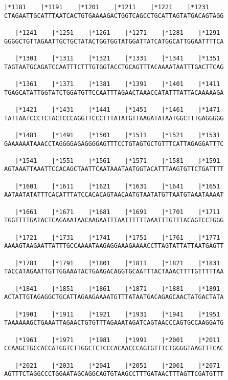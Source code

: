 \documentclass{article}
\begin{document}
\begin{Verbatim}[fontfamily=courier]
   |*1181    |*1191    |*1201    |*1211    |*1221    |*1231 
CTAGAATTGCATTTAATCACTGTGAAAAGACTGGTCAGCCTGCATTAGTATGACAGTAGG

   |*1241    |*1251    |*1261    |*1271    |*1281    |*1291 
GGGGCTGTTAGAATTGCTGCTATACTGGTGGTATGGATTATCATGGCATTGGAATTTTCA

   |*1301    |*1311    |*1321    |*1331    |*1341    |*1351 
TAGTAATGCAGATCCAATTTCTTTGTGGTACCTGCAGTTTACAAAATAATTTGACTTCAG

   |*1361    |*1371    |*1381    |*1391    |*1401    |*1411 
TGAGCATATTGGTATCTGGATGTTCCAATTTAGAACTAAACCATATTTATTACAAAAAGA

   |*1421    |*1431    |*1441    |*1451    |*1461    |*1471 
TATTAATCCCTCTACTCCCAGGTTCCCTTTATATGTTAAGATATAATGGCTTTGAGGGGG

   |*1481    |*1491    |*1501    |*1511    |*1521    |*1531 
GAAAAAATAAACCTAGGGGAGAGGGGAGTTTCCTGTAGTGCTGTTTCATTAGAGGATTTC

   |*1541    |*1551    |*1561    |*1571    |*1581    |*1591 
AGTAAATTAAATTCCACAGCTAATTCAATAAATAATGGTACATTTAAGTGTTCTGATTTT

   |*1601    |*1611    |*1621    |*1631    |*1641    |*1651 
AATAATATATTTCACATTTATCCACACAGTAACAATGTAATATGTTAATGTAAATAAAAT

   |*1661    |*1671    |*1681    |*1691    |*1701    |*1711 
TGGTTTTGATACTCAGAAATAACAAGAATTTAATTTTTTAAATTTGTTTACAGTCCTGGG

   |*1721    |*1731    |*1741    |*1751    |*1761    |*1771 
AAAAGTAAGAATTATTTGCCAAAATAAGAGGAAAGAAAACCTTAGTATTATTAATGAGTT

   |*1781    |*1791    |*1801    |*1811    |*1821    |*1831 
TACCATAGAATTGTTGGAAATACTGAAGACAGGTGCAATTTACTAAACTTTTGTTTTTAA

   |*1841    |*1851    |*1861    |*1871    |*1881    |*1891 
ACTATTGTAGAGGCTGCATTAGAAGAAAATGTTTATAATGACAGAGCAACTATGACTATA

   |*1901    |*1911    |*1921    |*1931    |*1941    |*1951 
TAAAAAAGCTGAAATTAGAACTGTGTTTAGAAATAGATCAGTAACCCAGTGCCAAGGATG

   |*1961    |*1971    |*1981    |*1991    |*2001    |*2011 
CCAAGCTGCCACCATGGTCTTGGCTCTCCCACAACCCAGTGTTTCTGGGGTAAGTTTCAC

   |*2021    |*2031    |*2041    |*2051    |*2061    |*2071 
AGTTTCTAGGCCCTGGAATAGCAGGCAGTGTAAGCCTTTGATAACTTTAGTTCGATGTTT

\end{Verbatim}
\newpage
\end{document}
